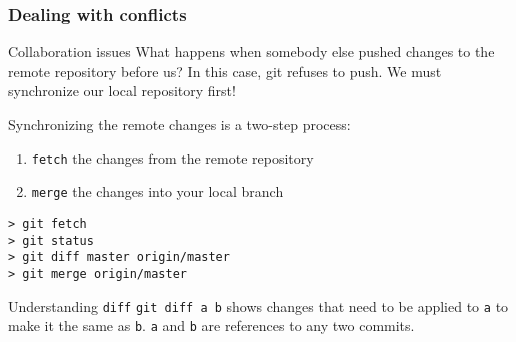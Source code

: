 \begin{frame}[fragile]
	\frametitle{Dealing with conflicts}

	\begin{block}{Collaboration issues}
What happens when somebody else pushed changes to the remote repository before us? In this case, git refuses to push. We must synchronize our local repository first!
	\end{block}	

	
	Synchronizing the remote changes is a two-step process:
	\begin{enumerate}
		\item \texttt{fetch} the changes from the remote repository
		\item \texttt{merge} the changes into your local branch
	\end{enumerate}
	
	\begin{verbatim}
> git fetch
> git status
> git diff master origin/master
> git merge origin/master
	\end{verbatim}
	
	\begin{block}{Understanding \texttt{diff}}
	\texttt{git diff a b} shows changes that need to be applied to \texttt{a} to make it the same as \texttt{b}. \texttt{a} and \texttt{b} are references to any two commits.
	\end{block}
	
\end{frame}


